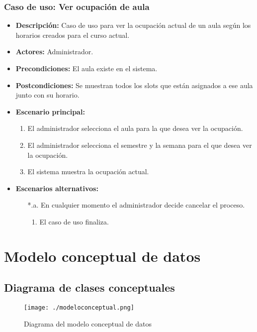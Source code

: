 \subsubsection*{Caso de uso: Ver ocupación de aula}
\begin{itemize}
\item{\bf Descripción:} Caso de uso para ver la ocupación actual de un aula según los horarios creados para el curso actual.
\item{\bf Actores:} Administrador.
\item{\bf Precondiciones:} El aula existe en el sistema.
\item{\bf Postcondiciones:} Se muestran todos los slots que están asignados a ese aula junto con su horario.
\item{\bf Escenario principal:}
	\begin{enumerate}
	\item El administrador selecciona el aula para la que desea ver la ocupación.
	\item El administrador selecciona el semestre y la semana para el que desea ver la ocupación.
	\item El sistema muestra la ocupación actual.
	\end{enumerate}
\item{\bf Escenarios alternativos:}
	\begin{itemize}
		\item[*.a.] En cualquier momento el administrador decide cancelar el proceso.
		\begin{enumerate}
			\item El caso de uso finaliza.
		\end{enumerate}
	\end{itemize}
\end{itemize}

\section{Modelo conceptual de datos}

\subsection{Diagrama de clases conceptuales}

\begin{figure}[H] 
  \label{modelo-conceptual} 
	\begin{center}
    \texttt{[image: ./modeloconceptual.png]}
  \end{center}
\caption{Diagrama del modelo conceptual de datos}
\end{figure}

